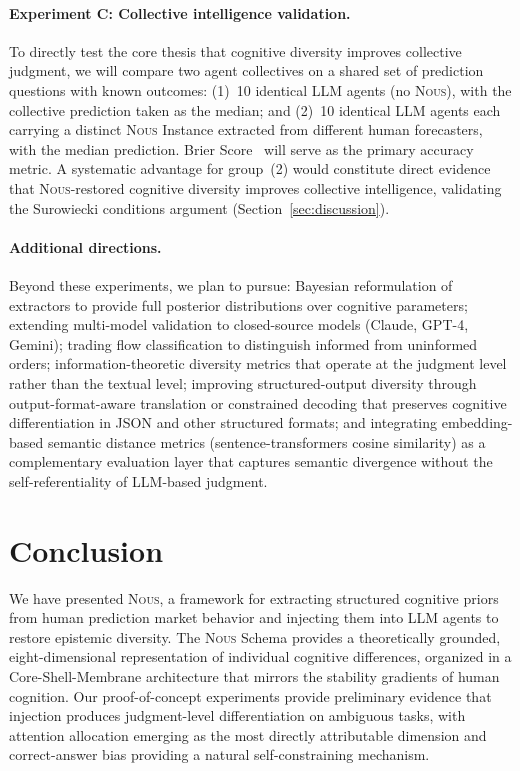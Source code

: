 \documentclass[11pt]{article}
\newcommand{\nous}{\textsc{Nous}}
\begin{document}
\paragraph{Experiment C: Collective intelligence validation.}
To directly test the core thesis that cognitive diversity improves collective judgment, we will compare two agent collectives on a shared set of prediction questions with known outcomes: (1)~10 identical LLM agents (no \nous{}), with the collective prediction taken as the median; and (2)~10 identical LLM agents each carrying a distinct \nous{} Instance extracted from different human forecasters, with the median prediction. Brier Score~\citep{brier1950verification} will serve as the primary accuracy metric. A systematic advantage for group~(2) would constitute direct evidence that \nous{}-restored cognitive diversity improves collective intelligence, validating the Surowiecki conditions argument (Section~\ref{sec:discussion}).

\paragraph{Additional directions.} Beyond these experiments, we plan to pursue: Bayesian reformulation of extractors to provide full posterior distributions over cognitive parameters; extending multi-model validation to closed-source models (Claude, GPT-4, Gemini); trading flow classification to distinguish informed from uninformed orders; information-theoretic diversity metrics that operate at the judgment level rather than the textual level; improving structured-output diversity through output-format-aware translation or constrained decoding that preserves cognitive differentiation in JSON and other structured formats; and integrating embedding-based semantic distance metrics (sentence-transformers cosine similarity) as a complementary evaluation layer that captures semantic divergence without the self-referentiality of LLM-based judgment.


\section{Conclusion}
\label{sec:conclusion}

We have presented \nous{}, a framework for extracting structured cognitive priors from human prediction market behavior and injecting them into LLM agents to restore epistemic diversity. The \nous{} Schema provides a theoretically grounded, eight-dimensional representation of individual cognitive differences, organized in a Core-Shell-Membrane architecture that mirrors the stability gradients of human cognition. Our proof-of-concept experiments provide preliminary evidence that injection produces judgment-level differentiation on ambiguous tasks, with attention allocation emerging as the most directly attributable dimension and correct-answer bias providing a natural self-constraining mechanism.
\end{document}
